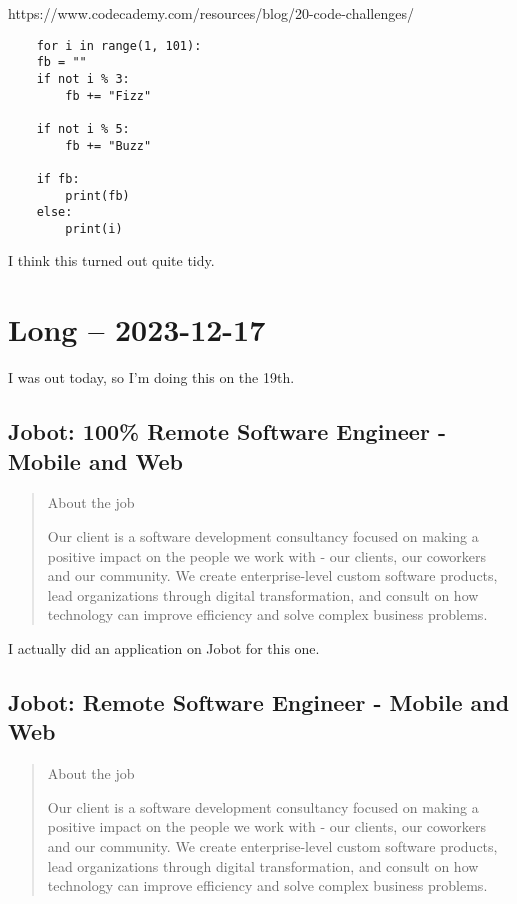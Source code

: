 \documentclass[
	letterpaper, %
	12pt, %
]{CSSullivanBusinessReport}
\begin{document}
https://www.codecademy.com/resources/blog/20-code-challenges/

\begin{verbatim}
	for i in range(1, 101):
    fb = ""
    if not i % 3:
        fb += "Fizz"

    if not i % 5:
        fb += "Buzz"

    if fb:
        print(fb)
    else:
        print(i)
\end{verbatim}

I think this turned out quite tidy. 


\section[17 Dec: Short]{Long -- 2023-12-17} %

I was out today, so I'm doing this on the 19th. 


\subsection[Jobot]{Jobot: 100\% Remote Software Engineer - Mobile and Web}

\begin{quote}
	About the job
	
	Our client is a software development consultancy focused on making a positive impact on the people we work with - our clients, our coworkers and our community. We create enterprise-level custom software products, lead organizations through digital transformation, and consult on how technology can improve efficiency and solve complex business problems.

\end{quote}

I actually did an application on Jobot for this one. 


\subsection[Jobot]{Jobot: Remote Software Engineer - Mobile and Web}

\begin{quote}
	About the job
	
	Our client is a software development consultancy focused on making a positive impact on the people we work with - our clients, our coworkers and our community. We create enterprise-level custom software products, lead organizations through digital transformation, and consult on how technology can improve efficiency and solve complex business problems.

\end{quote}
\end{document}
